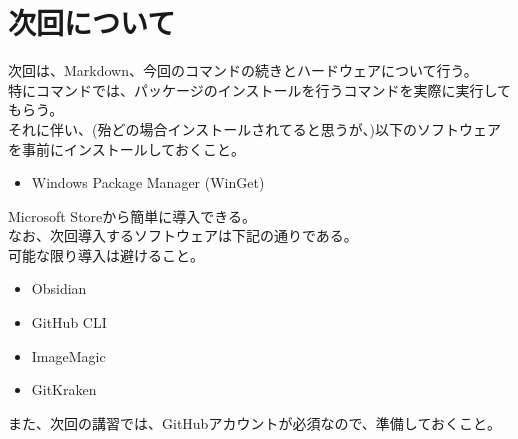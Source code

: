 \documentclass{ltjsarticle}
\begin{document}
\section{次回について}
次回は、Markdown、今回のコマンドの続きとハードウェアについて行う。\\
特にコマンドでは、パッケージのインストールを行うコマンドを実際に実行してもらう。\\
それに伴い、(殆どの場合インストールされてると思うが、)以下のソフトウェアを事前にインストールしておくこと。
\begin{itemize}
    \item Windows Package Manager (WinGet)
\end{itemize}
Microsoft Storeから簡単に導入できる。\\


なお、次回導入するソフトウェアは下記の通りである。\\
可能な限り導入は避けること。
\begin{itemize}
    \item Obsidian
    \item GitHub CLI
    \item ImageMagic
    \item GitKraken
\end{itemize}

また、次回の講習では、GitHubアカウントが必須なので、準備しておくこと。
\end{document}
